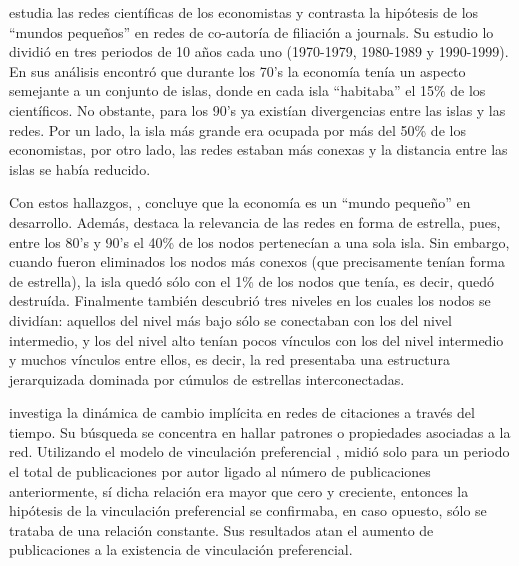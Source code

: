 \documentclass[12pt,letter]{article}
\begin{document}
\vspace{0.5cm}


\cite{Goyal} estudia las redes científicas de los economistas y contrasta la hipótesis de los ``mundos pequeños'' en redes de co-autoría de filiación a journals. Su estudio lo dividió en tres periodos de 10 años cada uno (1970-1979, 1980-1989 y 1990-1999). En sus análisis encontró que durante los 70's la economía tenía un aspecto semejante a un conjunto de islas, donde en cada isla ``habitaba'' el 15\% de los científicos. No obstante, para los 90's ya existían divergencias entre las islas y las redes. Por un lado, la isla más grande era ocupada por más del 50\% de los economistas, por otro lado, las redes estaban más conexas y la distancia entre las islas se había reducido.

\vspace{0.5cm}

Con estos hallazgos, \cite{Goyal}, concluye que la economía es un ``mundo pequeño'' en desarrollo. Además, \cite{Goyal} destaca la relevancia de las redes en forma de estrella, pues, entre los 80's y 90's el 40\% de los nodos pertenecían a una sola isla. Sin embargo, cuando fueron eliminados los nodos más conexos (que precisamente tenían forma de estrella), la isla quedó sólo con el 1\% de los nodos que tenía, es decir, quedó destruída. Finalmente también descubrió tres niveles en los cuales los nodos se dividían: aquellos del nivel más bajo sólo se conectaban con los del nivel intermedio, y los del nivel alto tenían pocos vínculos con los del nivel intermedio y muchos vínculos entre ellos, es decir, la red presentaba una estructura jerarquizada dominada por cúmulos de estrellas interconectadas.

\vspace{0.5cm}

\cite{Newman2} investiga la dinámica de cambio implícita en redes de citaciones a través del tiempo. Su búsqueda se concentra en hallar patrones o propiedades asociadas a la red. Utilizando el modelo de vinculación preferencial \citep{Barabasi1}, midió solo para un periodo el total de publicaciones por autor ligado al número de publicaciones anteriormente, sí dicha relación era mayor que cero y creciente, entonces la hipótesis de la vinculación preferencial se confirmaba, en caso opuesto, sólo se trataba de una relación constante. Sus resultados atan el aumento de publicaciones a la existencia de vinculación preferencial.

\vspace{0.5cm}
\end{document}
